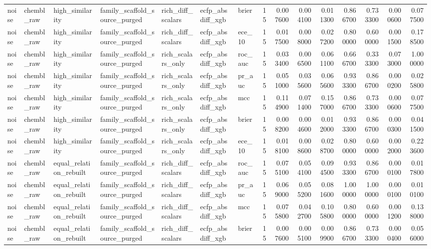 \begin{longtable}{lllllllrrrrrrrr}
noise & chembl\_raw & high\_similarity & family\_scaffold\_source\_purged & rich\_diff\_scalars & ecfp\_absdiff\_xgb & brier & 15 & 0.007600 & 0.004100 & 0.011300 & 0.866700 & 0.733300 & 0.000600 & 0.077500 \\
noise & chembl\_raw & high\_similarity & family\_scaffold\_source\_purged & rich\_diff\_scalars & ecfp\_absdiff\_xgb & ece\_10 & 15 & 0.017500 & 0.008000 & 0.027200 & 0.800000 & 0.600000 & 0.001500 & 0.178500 \\
noise & chembl\_raw & high\_similarity & family\_scaffold\_source\_purged & rich\_scalars\_only & ecfp\_absdiff\_xgb & roc\_auc & 15 & 0.033400 & 0.006500 & 0.061100 & 0.666700 & 0.333300 & 0.073000 & 1.000000 \\
noise & chembl\_raw & high\_similarity & family\_scaffold\_source\_purged & rich\_scalars\_only & ecfp\_absdiff\_xgb & pr\_auc & 15 & 0.051000 & 0.035600 & 0.065600 & 0.933300 & 0.866700 & 0.000200 & 0.025800 \\
noise & chembl\_raw & high\_similarity & family\_scaffold\_source\_purged & rich\_scalars\_only & ecfp\_absdiff\_xgb & mcc & 15 & 0.114900 & 0.071400 & 0.157000 & 0.866700 & 0.733300 & 0.000600 & 0.077500 \\
noise & chembl\_raw & high\_similarity & family\_scaffold\_source\_purged & rich\_scalars\_only & ecfp\_absdiff\_xgb & brier & 15 & 0.008200 & 0.004600 & 0.012000 & 0.933300 & 0.866700 & 0.000300 & 0.041500 \\
noise & chembl\_raw & high\_similarity & family\_scaffold\_source\_purged & rich\_scalars\_only & ecfp\_absdiff\_xgb & ece\_10 & 15 & 0.018100 & 0.008600 & 0.028700 & 0.800000 & 0.600000 & 0.002000 & 0.223600 \\
noise & chembl\_raw & equal\_relation\_rebuilt & family\_scaffold\_source\_purged & rich\_diff\_scalars & ecfp\_absdiff\_xgb & roc\_auc & 15 & 0.075100 & 0.054100 & 0.094500 & 0.933300 & 0.866700 & 0.000100 & 0.017800 \\
noise & chembl\_raw & equal\_relation\_rebuilt & family\_scaffold\_source\_purged & rich\_diff\_scalars & ecfp\_absdiff\_xgb & pr\_auc & 15 & 0.069000 & 0.055200 & 0.081600 & 1.000000 & 1.000000 & 0.000100 & 0.010100 \\
noise & chembl\_raw & equal\_relation\_rebuilt & family\_scaffold\_source\_purged & rich\_diff\_scalars & ecfp\_absdiff\_xgb & mcc & 15 & 0.075800 & 0.042700 & 0.105800 & 0.800000 & 0.600000 & 0.001200 & 0.138000 \\
noise & chembl\_raw & equal\_relation\_rebuilt & family\_scaffold\_source\_purged & rich\_diff\_scalars & ecfp\_absdiff\_xgb & brier & 15 & 0.007600 & 0.005100 & 0.009900 & 0.866700 & 0.733300 & 0.000400 & 0.056000 \\

\end{longtable}
